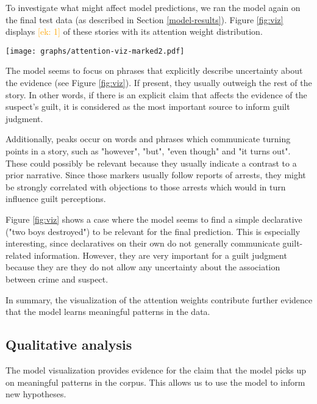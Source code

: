 \documentclass[11pt,a4paper]{article}
\newcommand{\ek}[1]{\textcolor{Orange}{[ek: #1]}}
\begin{document}
To investigate what might affect model predictions, we ran the model again on the final test data (as described in Section \ref{model-results}). Figure \ref{fig:viz} displays \ek{1} of these stories with its attention weight distribution.

\begin{figure*}
	\texttt{[image: graphs/attention-viz-marked2.pdf]}
	\caption{Visualization of the attention weights (y axis) for a tokenized story (x axis) from the test set. Because we took the softmax over the attention weights, the scale of the y axis is irrelevant. Interesting aspects are marked in yellow.}
	\label{fig:viz}
\end{figure*}

The model seems to focus on phrases that explicitly describe uncertainty about the evidence (see Figure \ref{fig:viz}). If present, they usually outweigh the rest of the story. In other words, if there is an explicit claim that affects the evidence of the suspect's guilt, it is considered as the most important source to inform guilt judgment.

Additionally, peaks occur on words and phrases which communicate turning points in a story, such as "however", "but", "even though" and "it turns out". These could possibly be relevant because they usually indicate a contrast to a prior narrative. Since those markers usually follow reports of arrests, they might be strongly correlated with objections to those arrests which would in turn influence guilt perceptions.

Figure \ref{fig:viz} shows a case where the model seems to find a simple declarative ("two boys destroyed") to be relevant for the final prediction. This is especially interesting, since declaratives on their own do not generally communicate guilt-related information. However, they are very important for a guilt judgment because they are they do not allow any uncertainty about the association between crime and suspect.

In summary, the visualization of the attention weights contribute further evidence that the model learns meaningful patterns in the data.

\subsection{Qualitative analysis}

The model visualization provides evidence for the claim that the model picks up on meaningful patterns in the corpus. This allows us to use the model to inform new hypotheses.
\end{document}

